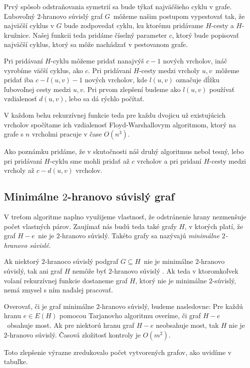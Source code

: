Prvý spôsob odstraňovania symetrií sa bude týkať najväčšieho cyklu v grafe. Ľubovoľný $2$-hranovo
súvislý graf $G$ môžeme našim postupom vypestovať tak, že najväčší cyklus v $G$ bude zodpovedať
cyklu, ku ktorému pridávame $H$-cesty a $H$-kružnice. Našej funkcii teda pridáme číselný parameter
$c$, ktorý bude popisovať najväčší cyklus, ktorý sa môže nachádzať v pestovanom grafe.

Pri pridávaní $H$-cyklu môžeme pridať nanajvýš $c - 1$ nových vrcholov, ináč vyrobíme väčší
cyklus, ako $c$. Pri pridávaní $H$-cesty medzi vrcholy $u, v$ môžeme pridať iba $c - l(u,v) - 1$ nových
vrcholov, kde $l(u,v)$ označuje dĺžku ľubovoľnej cesty medzi $u, v$. Pri prvom zlepšení budeme
ako $l(u,v)$ používať vzdialenosť $d(u,v)$, lebo sa dá rýchlo počítať.

V každom behu rekurzívnej funkcie teda pre každu dvojicu už existujúcich vrcholov spočítame
ich vzdialenosť Floyd-Warshallovym algoritmom, ktorý na grafe s $n$ vrcholmi pracuje v čase
$O(n^3)$.

Ako poznámku pridáme, že v skutočnosti náš druhý algoritmus nebol tesný, lebo pri pridávaní $H$-cyklu
sme mohli pridať až $c$ vrcholov a pri pridaní $H$-cesty medzi vrcholy až $c - d(u,v)$ vrcholov.

\subsection{Minimálne $2$-hranovo súvislý graf}

V treťom algoritme naplno využijeme vlastnosť, že odstránenie hrany nezmenšuje počet vlastných
párov. Zaujímať nás budú teda také grafy $H$, v ktorých platí, že graf $H - e$ nie je $2$-hranovo
súvislý. Takéto grafy sa nazývajú \emph{minimálne $2$-hranovo súvislé}.

Ak niektorý $2$-hranoco súvislý podgraf $G \subseteq H$ nie je minimálne $2$-hranovo súvislý,
tak ani graf $H$ nemôže byť $2$-hranovo súvislý \cite{min2con}. Ak teda v ktoromkoľvek volaní
rekurzívnej funkcie dostaneme graf $H$, ktorý nie je minimálne $2$-súvislý, nemá zmysel s ním
naďalej pracovať.

Overovať, či je graf minimálne $2$-hranovo súvislý, budeme nasledovne: Pre každú hranu $e \in E(H)$
pomocou Tarjanovho algoritmu overíme, či graf $H - e$ obsahuje most. Ak pre niektorú hranu graf $H - e$
neobsahuje most, tak $H$ nie je $2$-hranovo súvislý. Časová zložitosť kontroly je $O(m^2)$.

Toto zlepšenie výrazne zredukovalo počet vytvorených grafov, ako uvidíme v tabuľke.

